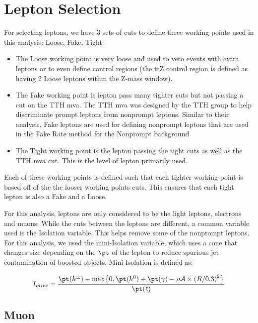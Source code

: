 
% 

\section{Lepton Selection}\label{sec:lepton-selection}

For selecting leptons, we have 3 sets of cuts to define three working points used in this analysis: Loose, Fake, Tight:
\begin{itemize}
  \item The Loose working point is very loose and used to veto events with extra leptons or to even define control regions (\eg the ttZ control region is defined as having 2 Loose leptons within the Z-mass window).
  \item The Fake working point is lepton pass many tighter cuts but not passing a cut on the TTH mva. The TTH mva was designed by the TTH group to help discriminate prompt leptons from nonprompt leptons. Similar to their analysis, Fake leptons are used for defining nonprompt leptons that are used in the Fake Rate method for the Nonprompt background
  \item The Tight working point is the lepton passing the tight cuts as well as the TTH mva cut. This is the level of lepton primarily used.
\end{itemize}

Each of these working points is defined such that each tighter working point is based off of the the looser working points cuts. This ensures that each tight lepton is also a Fake and a Loose.

For this analysis, leptons are only considered to be the light leptons, electrons and muons. While the cuts between the leptons are different, a common variable used is the Isolation variable. This helps remove some of the nonprompt leptons. For this analysis, we used the mini-Isolation variable, which uses a cone that changes size depending on the $\pt$ of the lepton to reduce spurious jet contamination of boosted objects. Mini-Isolation is defined as:

\begin{equation}\label{eq:isolation}
  I_{mini}=\frac{\pt(h^{\pm})-\max\bigl\{0,\pt(h^{0})+\pt(\gamma)-\rho\mathcal{A}\times{(R/0.3)}^{2}\bigr\}}{\pt(\ell)}
\end{equation}

\subsection{Muon}\label{sec:muon}

